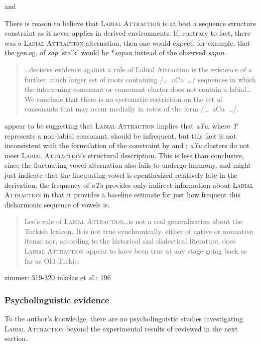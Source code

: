 \citet[225]{Clements1982} and \citet{Inkelas2001}

There is reason to believe that \textsc{Labial Attraction} is at best a sequence structure constraint as it never applies in derived environments. If, contrary to fact, there was a \textsc{Labial Attraction} alternation, then one would expect, for example, that the gen.sg. of \emph{sap} `stalk' would be *\emph{sapun} instead of the observed \emph{sapın}.

\citet{Lees1966a}
\citet{Zimmer1969}

\begin{quote}
\ldots decisive evidence against a rule of Labial Attraction is the existence of a further, much larger set of roots containing /\ldots~aCu~\ldots/ sequences in which the intervening consonant or consonant cluster does not contain a labial\ldots We conclude that there is no systematic restriction on the set of consonants that may occur medially in rotos of the form /\ldots~aCu~\ldots/. \citep[][225]{Clements1982}
\end{quote}

\noindent
\citeauthor{Clements1982} appear to be suggesting that \textsc{Labial Attraction} implies that \emph{aTu}, where \emph{T} represents a non-labial consonant, should be infrequent, but this fact is not inconsistent with the formulation of the constraint by \citet{Lees1966a,Lees1966b} and \citet{Zimmer1969}; \emph{aTu} clusters do not meet \textsc{Labial Attraction}'s structural description. This is less than conclusive, since the fluctuating vowel alternation also fails to undergo harmony, and might just indicate that the flucutating vowel is epenthesized relatively late in the derivation; the frequency of \emph{aTu} provides only indirect information about \textsc{Labial Attraction} in that it provides a baseline estimate for just how frequent this disharmonic sequence of vowels is.

\citet{Inkelas1997}
\citet{Inkelas2001}

\begin{quote}
Lee's rule of \textsc{Labial Attraction}\ldots is not a real generalization about the Turkish lexicon. It is not true synchronically, either of native or nonnative items; nor, according to the historical and dialectical literature, does \textsc{Labial Attraction} appear to have been true at any stage going back as far as Old Turkic. \citep[][196]{Inkelas2001}
\end{quote}

zimmer: 319-320 
inkelas et al.: 196

\subsubsection{Psycholinguistic evidence}

To the author's knowledge, there are no psycholinguistic studies investigating \textsc{Labial Attraction} beyond the experimental results of \citet{Zimmer1969} reviewed in the next section. 
